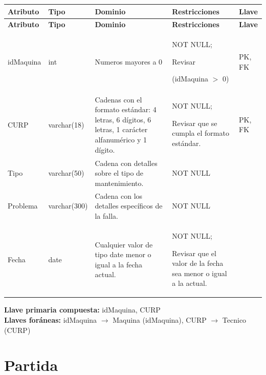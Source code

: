 \documentclass[12pt]{article}
\begin{document}
\begin{longtable}{p{3.2cm} p{2.2cm} p{4.8cm} p{4.2cm} p{1.2cm}}
\label{tab:reparar}\\
\toprule
\textbf{Atributo} & \textbf{Tipo} & \textbf{Dominio} & \textbf{Restricciones} & \textbf{Llave} \\
\midrule
\endfirsthead

\toprule
\textbf{Atributo} & \textbf{Tipo} & \textbf{Dominio} & \textbf{Restricciones} & \textbf{Llave} \\
\midrule
\endhead

\bottomrule
\endfoot

idMaquina 
& int 
& Numeros mayores a 0
& NOT NULL;

Revisar

(idMaquina $>$ 0)
& PK, FK \\

CURP 
& varchar(18) 
& Cadenas con el formato estándar: 4 letras, 6 dígitos, 6 letras, 1 carácter alfanumérico y 1 dígito.
& NOT NULL;

Revisar que se cumpla
el formato estándar.
& PK, FK \\

Tipo 
& varchar(50)
& Cadena con detalles sobre el tipo de mantenimiento.
& NOT NULL 
& \\

Problema 
& varchar(300)
& Cadena con los detalles específicos de la falla.
& NOT NULL 
& \\

Fecha 
& date 
& Cualquier valor de tipo date menor o igual a la fecha actual.
& NOT NULL;

Revisar que el valor de la fecha sea menor o igual a la actual.
& \\

\end{longtable}

\vspace{2pt}
\textbf{Llave primaria compuesta:} idMaquina, CURP\\
\textbf{Llaves foráneas:} idMaquina $\rightarrow$ Maquina (idMaquina), CURP $\rightarrow$ Tecnico (CURP)\\


\section*{Partida}
\end{document}
